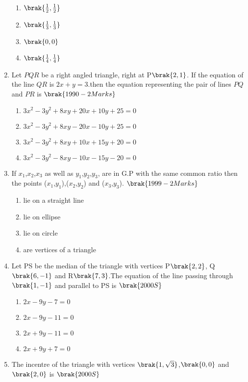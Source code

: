 \begin{enumerate}
\begin{enumerate}
      \item $\brak{\frac{1}{2},\frac{1}{2}}$
      \item $\brak{\frac{1}{3},\frac{1}{3}}$
      \item $\brak{0,0}$
      \item $\brak{\frac{1}{4},\frac{1}{4}}$
    
\end{enumerate}
\item Let $PQR$ be a right angled triangle, right at P$\brak{2,1}$. If the equation of the line $QR$ is $2x+y=3$.then the equation representing the pair of lines $PQ$ and $PR$ is
\hfill{$\brak{1990-2 Marks}$}
\begin{enumerate}
    \item $3x^2-3y^2+8xy+20x+10y+25=0$
    \item $3x^2-3y^2+8xy-20x-10y+25=0$
    \item $3x^2-3y^2+8xy+10x+15y+20=0$
    \item $3x^2-3y^2-8xy-10x-15y-20=0$
\end{enumerate}
\item If $x_1$,$x_2$,$x_3$ as well as $y_1$,$y_2$,$y_3$, are in G.P with the same common ratio then the points ($x_1$,$y_1$),($x_2$,$y_2$) and ($x_3$,$y_3$).
\hfill{$\brak{1999-2 Marks}$}
\begin{enumerate}
    
        \item lie on a straight line
        \item lie on ellipse
        \item lie on circle
        \item are vertices of a triangle 
    
\end{enumerate}
\item Let PS be the median of the triangle with vertices P$\brak{2,2}$, Q$\brak{6,-1}$ and R$\brak{7,3}$.The equation of the line passing through $\brak{1,-1}$ and parallel to PS is 
\hfill{$\brak{2000S}$}
\begin{enumerate}

      \item $2x-9y-7=0$  
      \item $2x-9y-11=0$
      \item $2x+9y-11=0$
      \item $2x+9y+7=0$

\end{enumerate}
\item The incentre of the triangle with vertices $\brak{1,\sqrt{3}}$,$\brak{0,0}$ and $\brak{2,0}$ is 
\hfill{$\brak{2000S}$}
\begin{enumerate}
    

\end{enumerate}
\end{enumerate}
